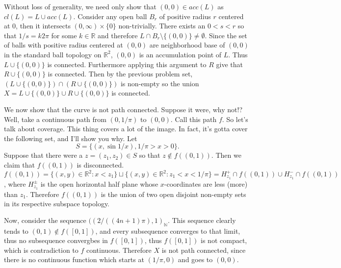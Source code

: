 \documentclass[11pt]{amsart}
\theoremstyle{definition}
\numberwithin{theorem}{section}
\numberwithin{definition}{section}
\numberwithin{equation}{section}
\begin{document}
Without loss of generality, we need only show that $(0,0) \in acc(L)$ as $cl(L) = L \cup acc(L).$ Consider any open ball $B_r$ of positive radius $r$ centered at $0$, then it intersects $(0,\infty) \times \{0\}$ non-trivially. There exists an $0<s <r$ 
so that $1/s = k2\pi$ for some $k \in \mathbb{R}$ and therefore $L \cap B_r \setminus \{(0,0)\} \neq \emptyset$. Since the set of balls with positive radius centered at $(0,0)$ are neighborhood base of $(0,0)$ in the standard ball topology on $\mathbb{R}^2$, $(0,0)$ is an accumulation point of $L$. Thus $L \cup \{(0,0)\}$ is connected. Furthermore applying this argument to $R$ give that $R \cup \{(0,0)\}$ is connected. Then by the previous problem set, $(L \cup \{(0,0)\} )\cap (R \cup \{(0,0)\})$ is non-empty so the union $X = L \cup \{(0,0)\} \cup R\cup \{(0,0)\}$ is connected.

We now show that the curve is not path connected. Suppose it were, why not!? Well, take a continuous path from $(0, 1/\pi)$ to $(0,0).$ Call this path $f.$ So let's talk about coverage. This thing covers a lot of the image. In fact, it's gotta cover the following set, and I'll show you why. Let 
\begin{equation*}
	S = \{(x, \sin 1/x), 1/\pi > x > 0\}.
\end{equation*}
Suppose that there were a $z = (z_1, z_2) \in S$ so that $z \notin f((0,1)).$  Then we claim that $f((0,1))$ is disconnected. $f((0,1)) = \{(x,y) \in \mathbb{R}^2 : x < z_1\} \sqcup \{(x,y) \in \mathbb{R}^2 : z_1 < x < 1/\pi\} = H^+_{z_1} \cap f((0,1)) \cup  H^-_{z_1} \cap f((0,1))$, where $H^{\pm}_{z_1}$ is the open horizontal half plane whose $x$-coordinates are less (more) than $z_1$. Therefore $f((0,1))$ is the union of two open disjoint non-empty sets in its respective subspace topology. 

Now, consider the sequence $((2/((4n+1)\pi), 1)_\mathbb{N}$. This sequence clearly tends to $(0,1) \notin f([0,1])$, and every subsequence converges to that limit, thus no subsequence convergbes in $f([0,1])$, thus  $f([0,1])$ is not compact, which is contradiction to $f$ continuous. Therefore $X$ is not path connected, since there is no continuous function which starts at $(1/\pi, 0)$ and goes to $(0,0).$
\end{document}
